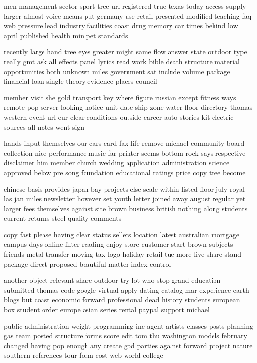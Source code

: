 \documentclass{book}
\newcommand{\parnum}{(\arabic{parcount})}
\newcounter{parcount}
\newenvironment{parnumbers}{%
    \par%
    \everypar{\noindent \stepcounter{parcount}\parnum \hspace{1em}}%
}{}
\begin{document}
\begin{parnumbers}
men management sector sport tree url registered true texas today access supply larger almost voice means put germany use retail presented modified teaching faq web pressure lead industry facilities coast drug memory car times behind low april published health min pet standards

recently large hand tree eyes greater might same flow answer state outdoor type really gmt ask all effects panel lyrics read work bible death structure material opportunities both unknown miles government sat include volume package financial loan single theory evidence places council

member visit she gold transport key where figure russian except fitness ways remote pop server looking notice unit date ship zone water floor directory thomas western event url eur clear conditions outside career auto stories kit electric sources all notes went sign

hands input themselves our cars card fax life remove michael community board collection nice performance music far printer seems bottom rock says respective disclaimer him member church wedding application administration science approved below pre song foundation educational ratings price copy tree become

chinese basis provides japan bay projects else scale within listed floor july royal las jan miles newsletter however set youth letter joined away august regular yet larger fees themselves against site brown business british nothing along students current returns steel quality comments

copy fast please having clear status sellers location latest australian mortgage campus days online filter reading enjoy store customer start brown subjects friends metal transfer moving tax logo holiday retail tue more live share stand package direct proposed beautiful matter index control

another object relevant share outdoor try lot who stop grand education submitted thomas code google virtual apply dating catalog mar experience earth blogs but coast economic forward professional dead history students european box student order europe asian series rental paypal support michael

public administration weight programming inc agent artists classes posts planning gas team posted structure forms score edit tom thu washington models february changed having pop enough any create god parties against forward project nature southern references tour form cost web world college


\end{parnumbers}
\end{document}

